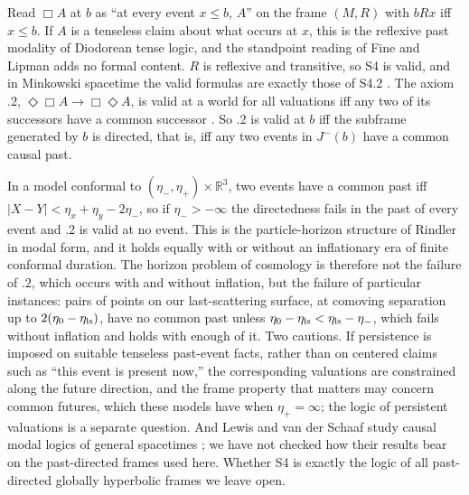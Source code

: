Read $\Box A$ at $b$ as ``at every event $x\le b$, $A$'' on the frame $(M,R)$
with $bRx$ iff $x\le b$. If $A$ is a tenseless claim about what occurs at $x$,
this is the reflexive past modality of Diodorean tense logic, and the
standpoint reading of Fine and Lipman \citep{Fine2005,Lipman2023} adds no
formal content. $R$ is reflexive and transitive, so S4 is valid, and in
Minkowski spacetime the valid formulas are exactly those of S4.2
\citep{Goldblatt1980}. The axiom .2, $\Diamond\Box A\to\Box\Diamond A$, is valid at a
world for all valuations iff any two of its successors have a common
successor \citep{BdRV2001}. So .2 is valid at $b$ iff the subframe generated
by $b$ is directed, that is, iff any two events in $J^-(b)$ have a common
causal past.

In a model conformal to $(\eta_-,\eta_+)\times\mathbb R^3$, two events have a
common past iff $|X-Y|<\eta_x+\eta_y-2\eta_-$, so if $\eta_->-\infty$ the
directedness fails in the past of every event and .2 is valid at no event. This is the particle-horizon structure of Rindler
\citep{Rindler1956} in modal form, and it holds equally with or without an
inflationary era of finite conformal duration. The horizon problem of
cosmology \citep{Guth1981} is therefore not the failure of .2, which occurs
with and without inflation, but the failure of particular instances: pairs of points
on our last-scattering surface, at comoving separation up to
$2(\eta_0-\eta_{\rm ls})$, have no common past unless
$\eta_0-\eta_{\rm ls}<\eta_{\rm ls}-\eta_-$, which fails without inflation and
holds with enough of it. Two cautions. If persistence is imposed on suitable tenseless past-event
facts, rather than on centered claims such as ``this event is present now,''
the corresponding valuations are
constrained along the future direction, and the frame property that matters
may concern common futures, which these models have when $\eta_+=\infty$; the logic of persistent
valuations is a separate question. And Lewis and van der Schaaf study causal
modal logics of general spacetimes \citep{vdSchaaf2026}; we have not checked
how their results bear on the past-directed frames used here. Whether S4 is
exactly the logic of all past-directed globally hyperbolic frames we leave
open.
